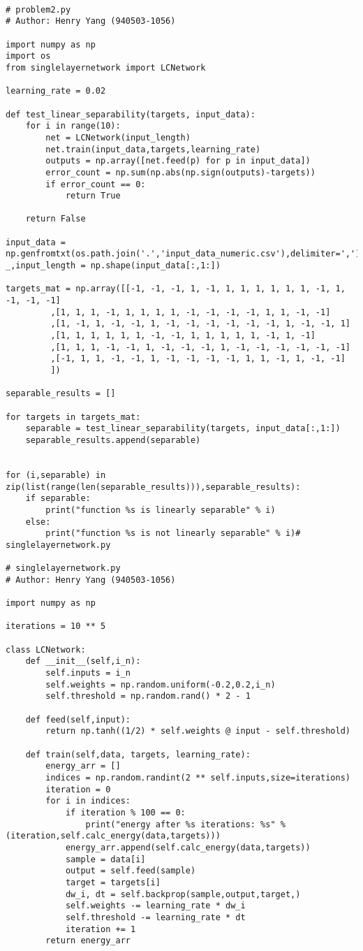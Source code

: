 \begin{verbatim}

# problem2.py
# Author: Henry Yang (940503-1056)

import numpy as np
import os
from singlelayernetwork import LCNetwork

learning_rate = 0.02

def test_linear_separability(targets, input_data): 
    for i in range(10):
        net = LCNetwork(input_length)
        net.train(input_data,targets,learning_rate)
        outputs = np.array([net.feed(p) for p in input_data])
        error_count = np.sum(np.abs(np.sign(outputs)-targets))
        if error_count == 0:
            return True
    
    return False

input_data = np.genfromtxt(os.path.join('.','input_data_numeric.csv'),delimiter=',')
_,input_length = np.shape(input_data[:,1:])

targets_mat = np.array([[-1, -1, -1, 1, -1, 1, 1, 1, 1, 1, 1, -1, 1, -1, -1, -1]
         ,[1, 1, 1, -1, 1, 1, 1, 1, -1, -1, -1, -1, 1, 1, -1, -1]
         ,[1, -1, 1, -1, -1, 1, -1, -1, -1, -1, -1, -1, 1, -1, -1, 1]
         ,[1, 1, 1, 1, 1, 1, -1, -1, 1, 1, 1, 1, 1, -1, 1, -1]
         ,[1, 1, 1, -1, -1, 1, -1, -1, -1, 1, -1, -1, -1, -1, -1, -1]
         ,[-1, 1, 1, -1, -1, 1, -1, -1, -1, -1, 1, 1, -1, 1, -1, -1]
         ])

separable_results = []

for targets in targets_mat:
    separable = test_linear_separability(targets, input_data[:,1:])
    separable_results.append(separable)


for (i,separable) in zip(list(range(len(separable_results))),separable_results):
    if separable:
        print("function %s is linearly separable" % i)
    else:
        print("function %s is not linearly separable" % i)# singlelayernetwork.py

# singlelayernetwork.py
# Author: Henry Yang (940503-1056)

import numpy as np

iterations = 10 ** 5

class LCNetwork:
    def __init__(self,i_n):
        self.inputs = i_n
        self.weights = np.random.uniform(-0.2,0.2,i_n)
        self.threshold = np.random.rand() * 2 - 1
    
    def feed(self,input):
        return np.tanh((1/2) * self.weights @ input - self.threshold)
    
    def train(self,data, targets, learning_rate):
        energy_arr = []
        indices = np.random.randint(2 ** self.inputs,size=iterations)
        iteration = 0
        for i in indices:
            if iteration % 100 == 0:
                print("energy after %s iterations: %s" % (iteration,self.calc_energy(data,targets)))
            energy_arr.append(self.calc_energy(data,targets))
            sample = data[i]
            output = self.feed(sample)
            target = targets[i]
            dw_i, dt = self.backprop(sample,output,target,)
            self.weights -= learning_rate * dw_i
            self.threshold -= learning_rate * dt
            iteration += 1
        return energy_arr


\end{verbatim}
